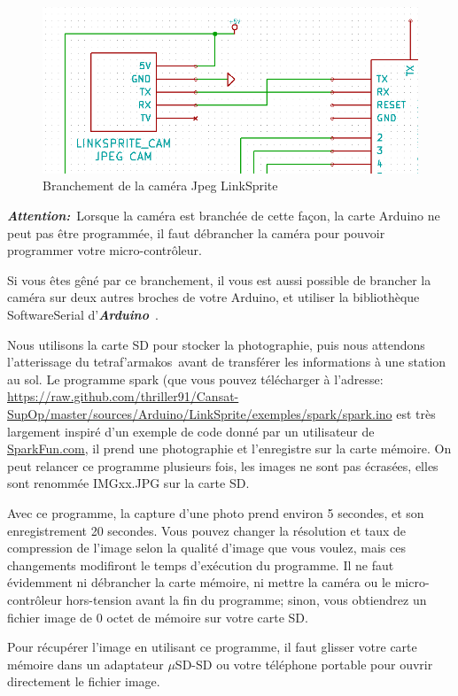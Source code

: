 \documentclass[twocolumn, 8pt]{article}
\newcommand\tet{\textgreek{tetraf'armakos}~}
\newcommand\Ard{\textbf{\emph{Arduino}}~}
\newcommand\Att{\textbf{\emph{Attention:}}~}
\begin{document}
\begin{figure}[!h]
	\centering
	\includegraphics[scale=.25]{LinkSprite.png}
	\caption{Branchement de la caméra Jpeg LinkSprite}
	\label{camera}
\end{figure}

\par \Att Lorsque la caméra est branchée de cette façon, la carte Arduino ne peut pas être programmée, il faut débrancher la caméra pour pouvoir programmer votre micro-contrôleur.
\par Si vous êtes gêné par ce branchement, il vous est aussi possible de brancher la caméra sur deux autres broches de votre Arduino, et utiliser la bibliothèque \textsf{SoftwareSerial} d'\Ard.
\par Nous utilisons la carte SD pour stocker la photographie, puis nous attendons l'atterissage du \tet avant de transférer les informations à une station au sol. Le programme \textsf{spark} (que vous pouvez télécharger à l'adresse: \url{https://raw.github.com/thriller91/Cansat-SupOp/master/sources/Arduino/LinkSprite/exemples/spark/spark.ino} est très largement inspiré d'un exemple de code donné par un utilisateur de \href{http://www.sparkfun.com/}{SparkFun.com}, il prend une photographie et l'enregistre sur la carte mémoire. On peut relancer ce programme plusieurs fois, les images ne sont pas écrasées, elles sont renommée \textsf{IMGxx.JPG} sur la carte SD.
\par Avec ce programme, la capture d'une photo prend environ 5 secondes, et son enregistrement 20 secondes. Vous pouvez changer la résolution et taux de compression de l'image selon la qualité d'image que vous voulez, mais ces changements modifiront le temps d'exécution du programme. Il ne faut évidemment ni débrancher la carte mémoire, ni mettre la caméra ou le micro-contrôleur hors-tension avant la fin du programme; sinon, vous obtiendrez un fichier image de 0 octet de mémoire sur votre carte SD.
\par Pour récupérer l'image en utilisant ce programme, il faut glisser votre carte mémoire dans un adaptateur $\mu$SD-SD ou votre téléphone portable pour ouvrir directement le fichier image.
\end{document}
